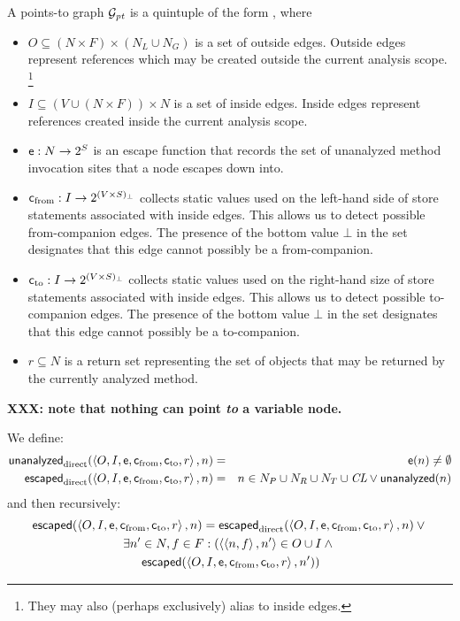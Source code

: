 \documentclass[11pt,notitlepage]{article}
\newcommand{\bigvar}[1]{\ensuremath{\text{\it #1}}}
\newcommand{\func}[1]{\ensuremath{\text{\sffamily #1}}}
\begin{document}
A points-to graph $\mathcal{G}_\bigvar{pt}$ is a quintuple of the form \ptgraph, where
\begin{itemize}
\item $O \subseteq (N\times F)\times(N_L \cup N_G)$ is a set of
outside edges.  Outside edges represent references which may be
created outside the current analysis scope.%
\footnote{They may also (perhaps exclusively) alias to inside edges.}
\item $I \subseteq (V\cup(N\times F))\times N$ is a set of inside
edges.  Inside edges represent references created inside the current
analysis scope.
\item $\func{e}:N\to 2^S$ is an escape function that records the set of
unanalyzed method invocation sites that a node escapes down into.
\item $\func{c}_\text{from}:I\to 2^{(V\times S)_\bot}$ collects static values
used on the left-hand side of store statements associated with
inside edges.  This allows us to detect possible from-companion edges.
The presence of the bottom value $\bot$ in the set designates that
this edge cannot possibly be a from-companion.
\item $\func{c}_\text{to}:I\to 2^{(V\times S)_\bot}$ collects static values
used on the right-hand size of store statements associated with
inside edges.  This allows us to detect possible to-companion edges.
The presence of the bottom value $\bot$ in the set designates that
this edge cannot possibly be a to-companion.
\item $r \subseteq N$ is a return set representing the set of objects
that may be returned by the currently analyzed method.
\end{itemize}
\textbf{XXX: note that nothing can point \emph{to} a variable node.}

We define:
\begin{eqnarray*}
\func{unanalyzed}_\text{direct}(\ptgraph, n) &=&
\func{e}(n)\neq\emptyset
\\
\func{escaped}_\text{direct}(\ptgraph, n) &=&
 n\in N_P \cup N_R \cup N_T \cup \bigvar{CL}
 \vee
 \func{unanalyzed}(n)
\end{eqnarray*}
and then recursively:
\begin{multline*}
\func{escaped}%
              (\ptgraph,n) =
 \func{escaped}_\text{direct}(\ptgraph,n) \vee {}
\\
 \exists n'\in N,f\in F : \left(\tuple{\tuple{n,f},n'}\in O\cup I
 \wedge
{} \right. \\ \left.
 \func{escaped}%
               (\ptgraph,n')\right)
\end{multline*}
\end{document}
